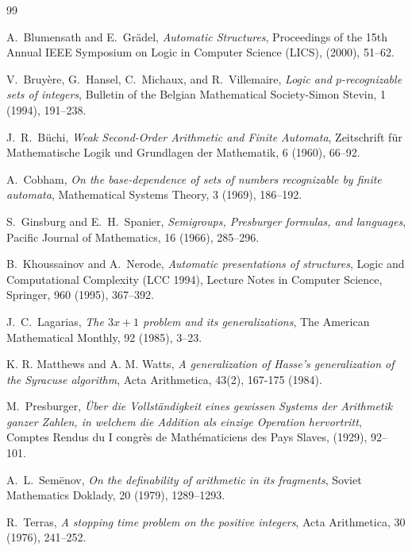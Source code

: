 \documentclass[11pt]{article}
\begin{document}
\begin{thebibliography}{99}

A.~Blumensath and E.~Gr\"adel,
\emph{Automatic Structures},
Proceedings of the 15th Annual IEEE Symposium on Logic in Computer Science (LICS),
(2000),
51--62.

V.~Bruy\`ere, G.~Hansel, C.~Michaux, and R.~Villemaire,
\emph{Logic and $p$-recognizable sets of integers},
Bulletin of the Belgian Mathematical Society-Simon Stevin,
1 (1994),
191--238.

J.~R.~B\"uchi,
\emph{Weak Second-Order Arithmetic and Finite Automata},
Zeitschrift f\"ur Mathematische Logik und Grundlagen der Mathematik,
6 (1960),
66--92.

A.~Cobham,
\emph{On the base-dependence of sets of numbers recognizable by finite automata},
Mathematical Systems Theory,
3 (1969),
186--192.

S.~Ginsburg and E.~H.~Spanier,
\emph{Semigroups, Presburger formulas, and languages},
Pacific Journal of Mathematics,
16 (1966),
285--296.

B.~Khoussainov and A.~Nerode,
\emph{Automatic presentations of structures},
Logic and Computational Complexity (LCC 1994), Lecture Notes in Computer Science, 
Springer, 960 (1995), 367--392.

J.~C.~Lagarias,
\emph{The $3x+1$ problem and its generalizations},
The American Mathematical Monthly,
92 (1985),
3--23.

K. R. Matthews and A. M. Watts,
\textit{A generalization of Hasse's generalization of the Syracuse algorithm},
Acta Arithmetica, 43(2), 167-175 (1984).

M.~Presburger,
\emph{Über die Vollständigkeit eines gewissen Systems der Arithmetik ganzer Zahlen, in welchem die Addition als einzige Operation hervortritt},
Comptes Rendus du I congrès de Mathématiciens des Pays Slaves,
(1929),
92--101.

A.~L.~Sem\"enov,
\emph{On the definability of arithmetic in its fragments},
Soviet Mathematics Doklady,
20 (1979),
1289--1293.

R.~Terras,
\emph{A stopping time problem on the positive integers},
Acta Arithmetica,
30 (1976),
241--252.

\end{thebibliography}
\end{document}
